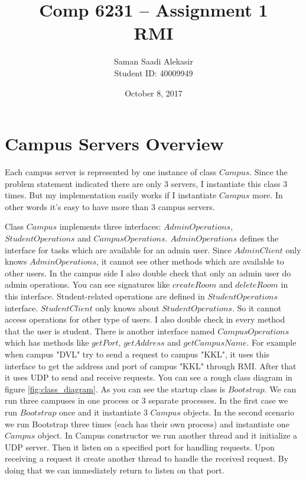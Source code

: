 \documentclass[12pt]{article}
\title{Comp 6231 -- Assignment 1\\RMI}
\author{Saman Saadi Alekasir\\Student ID: 40009949}
\date{October 8, 2017}
\begin{document}
\begin{titlepage}
\clearpage
{}
\maketitle
\thispagestyle{empty}
\end{titlepage}
\section{Campus Servers Overview}
Each campus server is represented by one instance of class $Campus$. Since the problem statement indicated there are only 3 servers, I instantiate this class 3 times. But my implementation easily works if I instantiate $Campus$ more. In other words it's easy to have more than 3 campus servers.
\par Class $Campus$ implements three interfaces: $AdminOperations$, $StudentOperations$ and $CampusOperations$. $AdminOperations$ defines the interface for tasks which are available for an admin user. Since $AdminClient$ only knows $AdminOperations$, it cannot see other methods which are available to other users. In the campus side I also double check that only an admin user do admin operations. You can see signatures like $createRoom$ and $deleteRoom$ in this interface. Student-related operations are defined in $StudentOperations$ interface. $StudentClient$ only knows about $StudentOperations$. So it cannot access operations for other type of users. I also double check in every method that the user is student. There is another interface named $CampusOperations$ which has methods like $getPort$, $getAddress$ and $getCampusName$. For example when campus "DVL" try to send a request to campus "KKL", it uses this interface to get the address and port of campus "KKL" through RMI. After that it uses UDP to send and receive requests. You can see a rough class diagram in figure \ref{fig:class_diagram}. As you can see the startup class is $Bootstrap$. We can run three campuses in one process or 3 separate processes. In the first case we run $Bootstrap$ once and it instantiate 3 $Campus$ objects. In the second scenario we run Bootstrap three times (each has their own process) and instantiate one $Campus$ object. In Campus constructor we run another thread and it initialize a UDP server. Then it listen on a specified port for handling requests. Upon receiving a request it create another thread to handle the received request. By doing that we can immediately return to listen on that port.
\end{document}
